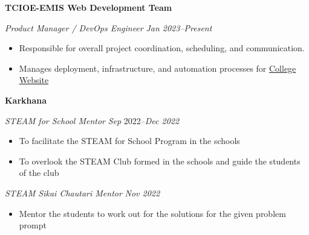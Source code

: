 \textbf{TCIOE-EMIS Web Development Team \hfill }\par

\textit{Product Manager / DevOps Engineer} \hfill \textit{Jan 2023--Present}
\begin{itemize}
	\item Responsible for overall project coordination, scheduling, and communication.
        \item Manages deployment, infrastructure, and automation processes for  \href{https://www.tcioe.edu.np}{College Website}
\end{itemize}\par

\textbf{Karkhana \hfill }\par
\textit{STEAM for School Mentor} \hfill \textit{Sep} 2022--\textit{Dec 2022}
\begin{itemize}
	\item To facilitate the STEAM for School Program in the schools
	\item To overlook the STEAM Club formed in the schools and guide the students of the club
\end{itemize}\par

\textit{STEAM Sikai Chautari Mentor} \hfill \textit{Nov 2022}
\begin{itemize}
	\item Mentor the students to work out for the solutions for the given problem prompt
\end{itemize}\par
